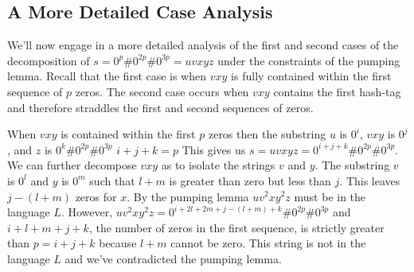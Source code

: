 \documentclass[10pt]{article}
\theoremstyle{definition}
\begin{document}
\subsection{A More Detailed Case Analysis}
\label{level2}

We'll now engage in a more detailed analysis of the first and second cases of the decomposition of $s=0^p\#0^{2p}\#0^{3p}= uvxyz$ under the constraints of the pumping lemma. Recall that the first case is when $vxy$ is fully contained within the first sequence of $p$ zeros. The second case occurs when $vxy$ contains the first hash-tag and therefore straddles the first and second sequences of zeros.

When $vxy$ is contained within the first $p$ zeros then the substring $u$ is $0^i$, $vxy$ is $0^j$, and $z$ is $0^k\# 0^{2p}\# 0^{3p}$ $i+j+k=p$ This gives us $s = uvxyz = 0^{i+j+k}\# 0^{2p}\# 0^{3p}$. We can further decompose $vxy$ as to isolate the strings $v$ and $y$. The substring $v$ is $0^l$ and $y$ is $0^m$ such that $l+m$ is greater than zero but less than $j$. This leaves $j-(l+m)$ zeros for $x$. By the pumping lemma $uv^2xy^2z$ must be in the language $L$. However, $uv^2xy^2z = 0^{i+2l+2m+j-(l+m)+k} \# 0^{2p} \# 0^{3p}$ and $i+l+m+j+k$, the number of zeros in the first sequence, is strictly greater than $p=i+j+k$ because $l+m$ cannot be zero. This string is not in the language $L$ and we've contradicted the pumping lemma.
\end{document}
